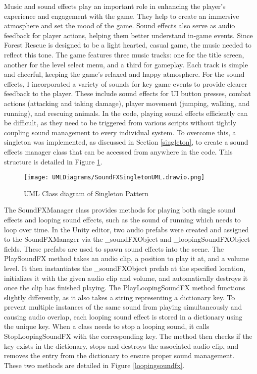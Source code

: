 \documentclass[10pt]{final_report}
\begin{document}
Music and sound effects play an important role in enhancing the player's experience and engagement with the game. They help to create an immersive atmosphere and set the mood of the game. Sound effects also serve as audio feedback for player actions, helping them better understand in-game events. Since Forest Rescue is designed to be a light hearted, casual game, the music needed to reflect this tone. The game features three music tracks: one for the title screen, another for the level select menu, and a third for gameplay. Each track is simple and cheerful, keeping the game's relaxed and happy atmosphere. For the sound effects, I incorporated a variety of sounds for key game events to provide clearer feedback to the player. These include sound effects for UI button presses, combat actions (attacking and taking damage), player movement (jumping, walking, and running), and rescuing animals. 
\newline
In the code, playing sound effects efficiently can be difficult, as they need to be triggered from various scripts without tightly coupling sound management to every individual system. To overcome this, a singleton was implemented, as discussed in Section \ref{singleton}, to create a sound effects manager class that can be accessed from anywhere in the code. This structure is detailed in Figure \ref{fig:label_singletonSoundFX}.
\begin{figure}[H]
    \centering
    \texttt{[image: UMLDiagrams/SoundFXSingletonUML.drawio.png]}
    \caption{UML Class diagram of Singleton Pattern}
    \label{fig:label_singletonSoundFX}
\end{figure}

The SoundFXManager class provides methods for playing both single sound effects and looping sound effects, such as the sound of running which needs to loop over time. In the Unity editor, two audio prefabs were created and assigned to the SoundFXManager via the \_soundFXObject and \_loopingSoundFXObject fields. These prefabs are used to spawn sound effects into the scene. The PlaySoundFX method takes an audio clip, a position to play it at, and a volume level. It then instantiates the \_soundFXObject prefab at the specified location, initializes it with the given audio clip and volume, and automatically destroys it once the clip has finished playing. The PlayLoopingSoundFX method functions slightly differently, as it also takes a string representing a dictionary key. To prevent multiple instances of the same sound from playing simultaneously and causing audio overlap, each looping sound effect is stored in a dictionary using the unique key. When a class needs to stop a looping sound, it calls StopLoopingSoundFX with the corresponding key. The method then checks if the key exists in the dictionary, stops and destroys the associated audio clip, and removes the entry from the dictionary to ensure proper sound management. These two methods are detailed in Figure \ref{loopingsoundfx}.
\end{document}

